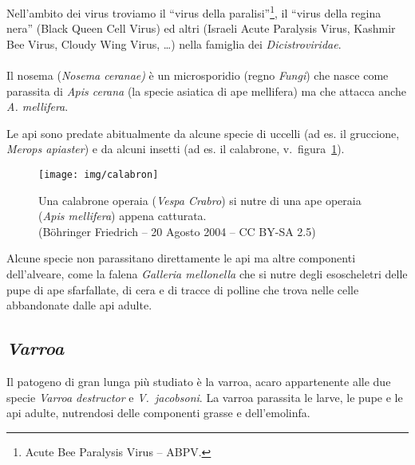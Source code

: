 Nell'ambito dei virus troviamo il ``virus della paralisi''\footnote{Acute Bee Paralysis Virus -- ABPV.}, il ``virus della regina nera'' (Black Queen Cell Virus) ed altri (Israeli Acute Paralysis Virus, Kashmir Bee Virus, Cloudy Wing Virus, \dots) nella famiglia dei \emph{Dicistroviridae}.

\paragraph{}
Il nosema (\emph{Nosema ceranae)} è un microsporidio (regno \emph{Fungi}) che nasce come parassita di \emph{Apis cerana} (la specie asiatica di ape mellifera) ma che attacca anche \emph{A. mellifera}.

Le api sono predate abitualmente da alcune specie di uccelli (ad es. il gruccione, \emph{Merops apiaster}) e da alcuni insetti (ad es. il calabrone, v.~figura~\ref{img:calabron}).

\begin{figure}[hbt]
    \centering
    \texttt{[image: img/calabron]}

    \caption[Ape predata da un calabrone.]{Una calabrone operaia (\emph{Vespa Crabro}) si
        nutre di una ape operaia (\emph{Apis mellifera}) appena catturata.
        \\ (Böhringer Friedrich -- 20 Agosto 2004 -- CC BY-SA 2.5)
    }
    \label{img:calabron}
\end{figure}

Alcune specie non parassitano direttamente le api ma altre componenti dell'alveare, come la falena \emph{Galleria mellonella} che si nutre degli esoscheletri delle pupe di ape sfarfallate, di cera e di tracce di polline che trova nelle celle abbandonate dalle api adulte.

\subsection{\emph{Varroa}}
Il patogeno di gran lunga più studiato è la varroa, acaro appartenente alle due specie \emph{Varroa destructor} e \emph{V.~jacobsoni}. La varroa parassita le larve, le pupe e le api adulte, nutrendosi delle componenti grasse e dell'emolinfa.

